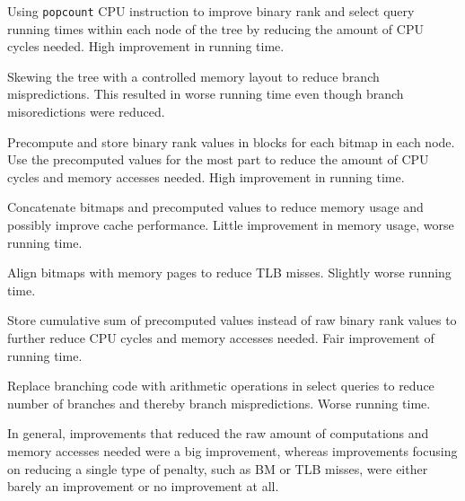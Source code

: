 \begin{description*}
\item[Using \texttt{popcount} CPU instruction] to improve binary rank and select query running times within each node of the tree by reducing the amount of CPU cycles needed. High improvement in running time. 
\item[Skewing the tree] with a controlled memory layout to reduce branch mispredictions. This resulted in worse running time even though branch misoredictions were reduced.
\item[Precompute and store binary rank values] in blocks for each bitmap in each node. Use the precomputed values for the most part to reduce the amount of CPU cycles and memory accesses needed. High improvement in running time.
\item[Concatenate bitmaps and precomputed values] to reduce memory usage and possibly improve cache performance. Little improvement in memory usage, worse running time.
\item[Align bitmaps with memory pages] to reduce TLB misses. Slightly worse running time.
\item[Store cumulative sum of precomputed values] instead of raw binary rank values to further reduce CPU cycles and memory accesses needed. Fair improvement of running time.
\item[Replace branching code with arithmetic operations] in select queries to reduce number of branches and thereby branch mispredictions. Worse running time.
\end{description*}

In general, improvements that reduced the raw amount of computations and memory accesses needed were a big improvement, whereas improvements focusing on reducing a single type of penalty, such as BM or TLB misses, were either barely an improvement or no improvement at all.